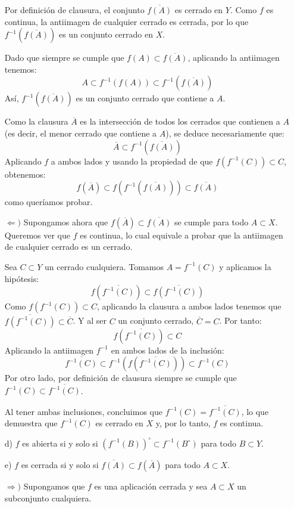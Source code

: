 \begin{ejer}
\begin{itemize}
\begin{sol}
    Por definición de clausura, el conjunto $\overline{f(A)}$ es cerrado en $Y$. Como $f$ es continua, la antiimagen de cualquier cerrado es cerrada, por lo que $f^{-1}(\overline{f(A)})$ es un conjunto cerrado en $X$.
    
    Dado que siempre se cumple que $f(A) \subset \overline{f(A)}$, aplicando la antiimagen tenemos:
    \[
        A \subset f^{-1}(f(A)) \subset f^{-1}(\overline{f(A)})
    \]
    Así, $f^{-1}(\overline{f(A)})$ es un conjunto cerrado que contiene a $A$.
    
    Como la clausura $\overline{A}$ es la intersección de todos los cerrados que contienen a $A$ (es decir, el menor cerrado que contiene a $A$), se deduce necesariamente que:
    \[
        \overline{A} \subset f^{-1}(\overline{f(A)})
    \]
    Aplicando $f$ a ambos lados y usando la propiedad de que $f(f^{-1}(C)) \subset C$, obtenemos:
    \[
        f(\overline{A}) \subset f\left(f^{-1}(\overline{f(A)})\right) \subset \overline{f(A)}
    \]
    como queríamos probar.

    \medskip

    $\Leftarrow)$ Supongamos ahora que $f(\overline{A}) \subset \overline{f(A)}$ se cumple para todo $A \subset X$. Queremos ver que $f$ es continua, lo cual equivale a probar que la antiimagen de cualquier cerrado es un cerrado.
    
    Sea $C \subset Y$ un cerrado cualquiera. Tomamos $A = f^{-1}(C)$ y aplicamos la hipótesis:
    \[
        f(\overline{f^{-1}(C)}) \subset \overline{f(f^{-1}(C))}
    \]
    Como $f(f^{-1}(C)) \subset C$, aplicando la clausura a ambos lados tenemos que $\overline{f(f^{-1}(C))} \subset \overline{C}$. Y al ser $C$ un conjunto cerrado, $\overline{C} = C$. Por tanto:
    \[
        f(\overline{f^{-1}(C)}) \subset C
    \]
    Aplicando la antiimagen $f^{-1}$ en ambos lados de la inclusión:
    \[
        \overline{f^{-1}(C)} \subset f^{-1}\left(f(\overline{f^{-1}(C)})\right) \subset f^{-1}(C)
    \]
    Por otro lado, por definición de clausura siempre se cumple que $f^{-1}(C) \subset \overline{f^{-1}(C)}$.
    
    Al tener ambas inclusiones, concluimos que $f^{-1}(C) = \overline{f^{-1}(C)}$, lo que demuestra que $f^{-1}(C)$ es cerrado en $X$ y, por lo tanto, $f$ es continua.
\end{sol}
        \item[d)] $f$ es abierta si y solo si $\left(f^{-1}(B)\right)^{\circ} \subset f^{-1} (B^{\circ})$ para todo $B\subset Y$. 
        \item[e)] $f$ es cerrada si y solo si $\overline{f(A)}\subset f (\overline{A}) $ para todo $A \subset X$.
        \begin{sol}
    $\Rightarrow)$ Supongamos que $f$ es una aplicación cerrada y sea $A \subset X$ un subconjunto cualquiera.
    

\end{sol}
\end{itemize}
\end{ejer}
